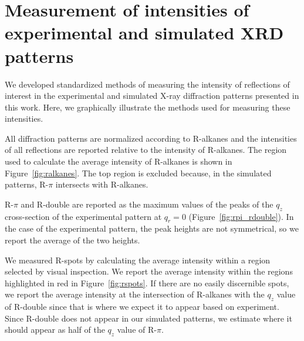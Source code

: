 \documentclass[journal=jpcbfk,manusciprt=article]{achemso}
\begin{document}
  \section{Measurement of intensities of experimental and simulated XRD patterns}\label{section:xrd_intensities}
  
  We developed standardized methods of measuring the intensity of reflections of interest
  in the experimental and simulated X-ray diffraction patterns presented in this work. Here,
  we graphically illustrate the methods used for measuring these intensities. 
  
  All diffraction patterns are normalized according to R-alkanes and the intensities
  of all reflections are reported relative to the intensity of R-alkanes. The region
  used to calculate the average intensity of R-alkanes is shown in 
  Figure~\ref{fig:ralkanes}. The top region is excluded because, in the simulated
  patterns, R-$\pi$ intersects with R-alkanes.
  
  R-$\pi$ and R-double are reported as the maximum values of the peaks of the 
  $q_z$ cross-section of the experimental pattern at $q_r=0$ (Figure~\ref{fig:rpi_rdouble}).
  In the case of the experimental pattern, the peak heights are not symmetrical,
  so we report the average of the two heights.
  
  We measured R-spots by calculating the average intensity within a region 
  selected by visual inspection. We report the average intensity within the regions 
  highlighted in red in Figure~\ref{fig:rspots}. If there are no easily discernible
  spots, we report the average intensity at the intersection of R-alkanes with
  the $q_z$ value of R-double since that is where we expect it to appear based on
  experiment. Since R-double does not appear in our simulated patterns, we 
  estimate where it should appear as half of the $q_z$ value of R-$\pi$.
  
\end{document}
